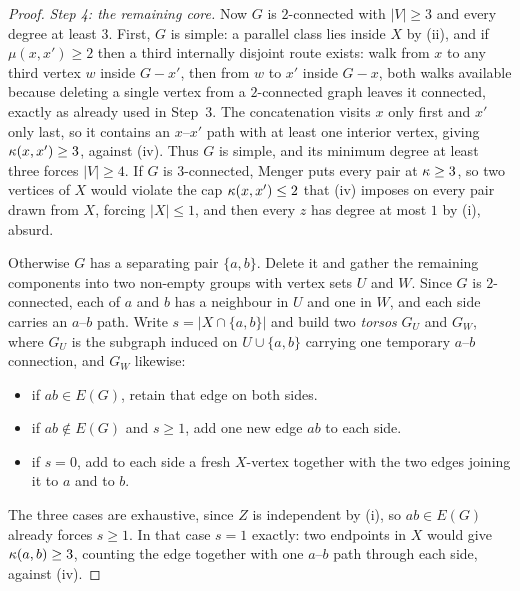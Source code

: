 \begin{proof}
\emph{Step 4: the remaining core.} Now $G$ is $2$-connected
with $|V| \ge 3$ and every degree at least $3$. First, $G$ is simple: a
parallel class lies inside $X$ by (ii), and if $\mu(x, x') \ge 2$ then a
third internally disjoint route exists: walk from $x$ to any third vertex
$w$ inside $G - x'$, then from $w$ to $x'$ inside $G - x$, both walks
available because deleting a single vertex from a $2$-connected graph leaves
it connected, exactly as already used in Step~3. The concatenation
visits $x$ only first and $x'$ only last, so it contains an $x$--$x'$ path
with at least one interior vertex, giving $\kappa(x, x') \ge 3$, against
(iv). Thus $G$ is simple, and its minimum degree at least three forces
$|V| \ge 4$. If $G$ is $3$-connected, Menger puts every pair at $\kappa \ge 3$, so
two vertices of $X$ would violate the cap $\kappa(x, x') \le 2$ that (iv)
imposes on every pair drawn from $X$, forcing $|X| \le 1$, and then every $z$
has degree at most $1$ by (i), absurd.

Otherwise $G$ has a separating pair $\{a, b\}$. Delete it and gather the
remaining components into two non-empty groups with vertex sets $U$ and $W$.
Since $G$ is $2$-connected, each of $a$ and $b$ has a neighbour in $U$ and one
in $W$, and each side carries an $a$--$b$ path. Write $s = |X \cap \{a,b\}|$ and
build two \emph{torsos} $G_U$ and $G_W$, where $G_U$ is the subgraph induced on
$U \cup \{a,b\}$ carrying one temporary $a$--$b$ connection, and $G_W$ likewise:

\begin{itemize}
    \item if $ab \in E(G)$, retain that edge on both sides.
    \item if $ab \notin E(G)$ and $s \ge 1$, add one new edge $ab$ to each side.
    \item if $s = 0$, add to each side a fresh $X$-vertex together with the two
          edges joining it to $a$ and to $b$.
\end{itemize}

The three cases are exhaustive, since $Z$ is independent by (i), so
$ab \in E(G)$ already forces $s \ge 1$. In that case $s = 1$ exactly: two
endpoints in $X$ would give $\kappa(a,b) \ge 3$, counting the edge together with
one $a$--$b$ path through each side, against (iv).


\end{proof}
